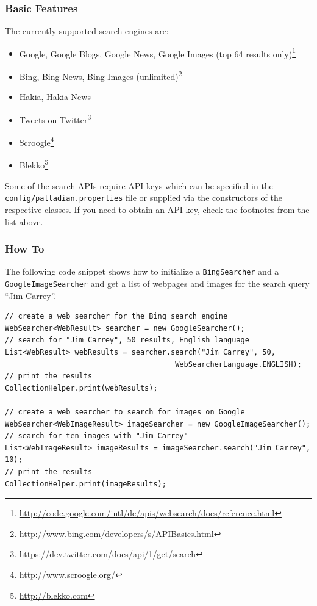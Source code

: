\subsubsection{Basic Features}
The currently supported search engines are:
\begin{itemize}
\item Google, Google Blogs, Google News, Google Images (top 64 results only)\footnote{\url{http://code.google.com/intl/de/apis/websearch/docs/reference.html}}
\item Bing, Bing News, Bing Images (unlimited)\footnote{\url{http://www.bing.com/developers/s/APIBasics.html}}
\item Hakia, Hakia News
\item Tweets on Twitter\footnote{\url{https://dev.twitter.com/docs/api/1/get/search}}
\item Scroogle\footnote{\url{http://www.scroogle.org/}}
\item Blekko\footnote{\url{http://blekko.com}}
\end{itemize}

Some of the search APIs require API keys which can be specified in the \texttt{config/palladian.properties} file or supplied via the constructors of the respective classes. If you need to obtain an API key, check the footnotes from the list above.

\subsubsection{How To}
\label{sec:howto}
The following code snippet shows how to initialize a \texttt{BingSearcher} and a \texttt{GoogleImageSearcher} and get a list of webpages and images for the search query ``Jim Carrey''.
\begin{codelisting}
\begin{lstlisting}[caption=Retrieving results from search engines.,frame=tb]
// create a web searcher for the Bing search engine
WebSearcher<WebResult> searcher = new GoogleSearcher();
// search for "Jim Carrey", 50 results, English language
List<WebResult> webResults = searcher.search("Jim Carrey", 50,
                                       WebSearcherLanguage.ENGLISH);
// print the results
CollectionHelper.print(webResults);
    
// create a web searcher to search for images on Google
WebSearcher<WebImageResult> imageSearcher = new GoogleImageSearcher();
// search for ten images with "Jim Carrey"
List<WebImageResult> imageResults = imageSearcher.search("Jim Carrey", 10);
// print the results
CollectionHelper.print(imageResults);
\end{lstlisting}
\end{codelisting}

